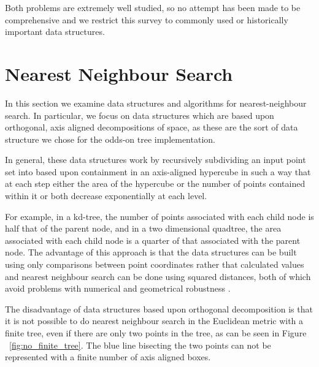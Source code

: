 \documentclass[mcs]{scsthesis}
\begin{document}
Both problems are extremely well studied, so no attempt has been made to be
comprehensive and we restrict this survey to commonly used or historically
important data structures.

\section{Nearest Neighbour Search}

In this section we examine data structures and algorithms for nearest-neighbour
search. In particular, we focus on data structures which are based upon
orthogonal, axis aligned decompositions of space, as these are the sort of data
structure we chose for the odds-on tree implementation.

In general, these data structures work by recursively subdividing an input point
set into based upon containment in an axis-aligned hypercube in such a way that
at each step either the area of the hypercube or the number of points contained
within it or both decrease exponentially at each level.

For example, in a kd-tree, the number of points associated with each child node
is half that of the parent node, and in a two dimensional quadtree, the area
associated with each child node is a quarter of that associated with the parent
node. The advantage of this approach is that the data structures can be built
using only comparisons between point coordinates rather that calculated values
and nearest neighbour search can be done using squared distances, both of which
avoid problems with numerical and geometrical robustness \cite{shewchuk}.

The disadvantage of data structures based upon orthogonal decomposition is that
it is not possible to do nearest neighbour search in the Euclidean metric with
a finite tree, even if there are only two points in the tree, as can be seen
in Figure ~\ref{fig:no_finite_tree}. The blue line bisecting the two
points can not be represented with a finite number of axis aligned boxes.
\end{document}
